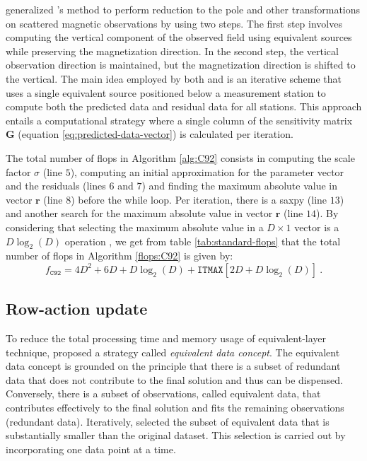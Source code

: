 \documentclass[utf8]{FrontiersinHarvard} %
\begin{document}
	\cite{guspi-novara2009} generalized \citeauthor{cordell1992}'s method to
	perform reduction to the pole and other transformations on scattered magnetic observations by using two steps. 
	The first step involves computing the vertical component of the observed field using equivalent sources while preserving the magnetization direction.
	In the second step, the vertical observation direction is maintained, but the magnetization direction is shifted to the vertical.
	The main idea employed by both \cite{cordell1992} and \cite{guspi-novara2009} is an iterative scheme that 
	uses a single equivalent source positioned below a measurement station to compute both the predicted data and residual data for all stations. 
	This approach entails a computational strategy where a single column of the sensitivity matrix $\mathbf{G}$ (equation \ref{eq:predicted-data-vector}) 
	is calculated per iteration.
	
	The total number of flops in Algorithm \ref{alg:C92} consists in 
	computing the scale factor $\sigma$ (line $5$), computing an initial approximation for the
	parameter vector and the residuals (lines $6$ and $7$) and 
	finding the maximum absolute value in vector $\mathbf{r}$ (line $8$) before the while loop. 
	Per iteration, there is a saxpy (line $13$) and 
	another search for the maximum absolute value in vector $\mathbf{r}$ (line $14$).
	By considering that selecting the maximum absolute value in a $D \times 1$ vector is a $D \log_{2}(D)$ operation \citep[e.g.,][p. 420]{press-etal2007},
	we get from table \ref{tab:standard-flops} that the total number of flops in Algorithm \ref{flops:C92} is given by:
	\begin{equation}
		f_{\mathtt{C92}} = 4D^{2} + 6D + D \log_{2}(D) + \mathtt{ITMAX} \left[2D + D \log_{2}(D) \right] \: .
		\label{flops:C92}
	\end{equation}
	
	\subsection{Row-action update}
	
	To reduce the total processing time and memory usage of equivalent-layer technique, \cite{mendonca-silva1994} proposed 
	a strategy called \textit{equivalent data concept}.
	The equivalent data concept is grounded on the  principle  that there is a subset of redundant data that does not 
	contribute to the final solution and thus can be dispensed.
	Conversely, there is a subset of observations, called equivalent data, that  contributes effectively to the 
	final solution and fits the remaining observations (redundant data).
	Iteratively, \cite{mendonca-silva1994} selected the subset of equivalent data that is substantially smaller than 
	the original dataset. 
	This selection is carried out by incorporating one data point at a time.
	
\end{document}
